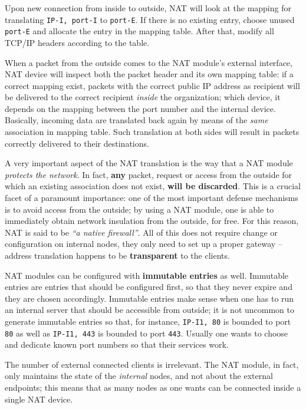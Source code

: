 \documentclass[10pt]{extbook}
\begin{document}
Upon new connection from inside to outside, NAT will look at the mapping for
translating \texttt{IP-I, port-I} to \texttt{port-E}. If there is no existing
entry, choose unused \texttt{port-E} and allocate the entry in the mapping
table. After that, modify all TCP/IP headers according to the table.

When a packet from the outside comes to the NAT module's external interface,
NAT device will inspect both the packet header and its own mapping table: if a
correct mapping exist, packets with the correct public IP address as recipient
will be delivered to the correct recipient \emph{inside} the organization;
which device, it depends on the mapping between the port number and the
internal device. Basically, incoming data are translated back again by means of
the \emph{same} association in mapping table. Such translation at both sides
will result in packets correctly delivered to their destinations.

A very important aspect of the NAT translation is the way that a NAT module
\emph{protects the network}. In fact, \textbf{any} packet, request or access
from the outside for which an existing association does not exist, \textbf{will
be discarded}. This is a crucial facet of a paramount importance: one of the
most important defense mechanisms is to avoid access from the outside; by using
a NAT module, one is able to immediately obtain network insulation from the
outside, for free. For this reason, NAT is said to be \emph{``a native
firewall''}. All of this does not require change or configuration on internal
nodes, they only need to set up a proper gateway -- address translation happens
to be \textbf{transparent} to the clients.

NAT modules can be configured with \textbf{immutable entries} as well.
Immutable entries are entries that should be configured first, so that they
never expire and they are chosen accordingly. Immutable entries make sense when
one has to run an internal server that should be accessible from outside; it is
not uncommon to generate immutable entries so that, for instance,
\texttt{IP-I1, 80} is bounded to port \texttt{80} as well as \texttt{IP-I1,
443} is bounded to port \texttt{443}. Usually one wants to choose and dedicate
known port numbers so that their services work.

The number of external connected clients is irrelevant. The NAT module, in
fact, only maintains the state of the \emph{internal} nodes, and not about the
external endpoints; this means that as many nodes as one wants can be connected
inside a single NAT device.
\end{document}
